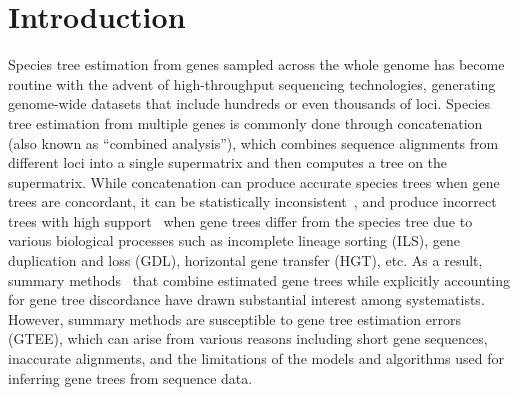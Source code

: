 \documentclass[10pt,a4paper]{article}
\providecommand{\keywords}[1]{\textbf{\textit{Keywords:}} #1}
\begin{document}
\begin{abstract}






\end{abstract}


\clearpage
{}

\section{Introduction}

Species tree estimation from genes sampled across the whole genome has become routine with the advent of high-throughput sequencing technologies, generating genome-wide datasets that include hundreds or even thousands of loci. Species tree estimation from multiple genes is commonly done through concatenation (also known as ``combined analysis''), which combines sequence alignments from different loci into a single supermatrix and then computes a tree on the supermatrix. While concatenation can produce accurate species trees when gene trees are concordant, it can be statistically inconsistent~\cite{roch2015likelihood,consensus-inconsistent}, and produce incorrect trees with high support~\cite{kubatko-degnan-2007} when gene trees differ from the species tree due to various biological processes such as incomplete lineage sorting (ILS), gene duplication and loss (GDL), horizontal gene transfer (HGT), etc. As a result, summary methods~\cite{mpest,astral,larget-bioinf2010,glass,stem,svdquartet,steac,njst,wqfm,astrid,stelar} that combine estimated gene trees while explicitly accounting for gene tree discordance have drawn substantial interest among systematists. However, summary methods are susceptible to gene tree estimation errors (GTEE), which can arise from various reasons including short gene sequences, inaccurate alignments, and the limitations of the models and algorithms used for inferring gene trees from sequence data. 
\end{document}
